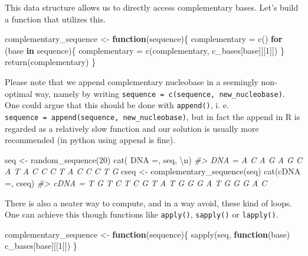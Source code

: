 \documentclass[
]{book}
\newenvironment{Shaded}{\begin{snugshade}}{\end{snugshade}}
\newcommand{\CommentTok}[1]{\textcolor[rgb]{0.56,0.35,0.01}{\textit{#1}}}
\newcommand{\ControlFlowTok}[1]{\textcolor[rgb]{0.13,0.29,0.53}{\textbf{#1}}}
\newcommand{\DecValTok}[1]{\textcolor[rgb]{0.00,0.00,0.81}{#1}}
\newcommand{\FunctionTok}[1]{\textcolor[rgb]{0.00,0.00,0.00}{#1}}
\newcommand{\NormalTok}[1]{#1}
\newcommand{\OtherTok}[1]{\textcolor[rgb]{0.56,0.35,0.01}{#1}}
\newcommand{\SpecialCharTok}[1]{\textcolor[rgb]{0.00,0.00,0.00}{#1}}
\newcommand{\StringTok}[1]{\textcolor[rgb]{0.31,0.60,0.02}{#1}}
\begin{document}
This data structure allows us to directly access complementary bases. Let's build a function that utilizes this.

\begin{Shaded}
\begin{Highlighting}[]
\NormalTok{complementary\_sequence }\OtherTok{\textless{}{-}} \ControlFlowTok{function}\NormalTok{(sequence)\{}
\NormalTok{  complementary }\OtherTok{=} \FunctionTok{c}\NormalTok{()}
  \ControlFlowTok{for}\NormalTok{ (base }\ControlFlowTok{in}\NormalTok{ sequence)\{}
\NormalTok{    complementary }\OtherTok{=} \FunctionTok{c}\NormalTok{(complementary, c\_bases[base][[}\DecValTok{1}\NormalTok{]])}
\NormalTok{  \}}
  \FunctionTok{return}\NormalTok{(complementary)}
\NormalTok{\}}
\end{Highlighting}
\end{Shaded}

Please note that we append complementary nucleobase in a seemingly non-optimal way, namely by writing \texttt{sequence\ =\ c(sequence,\ new\_nucleobase)}. One could argue that this should be done with \texttt{append()}, i. e. \texttt{sequence\ =\ append(sequence,\ new\_nucleobase)}, but in fact the append in R is regarded as a relatively slow function and our solution is usually more recommended (in python using append is fine).

\begin{Shaded}
\begin{Highlighting}[]
\NormalTok{seq }\OtherTok{\textless{}{-}} \FunctionTok{random\_sequence}\NormalTok{(}\DecValTok{20}\NormalTok{)}
\FunctionTok{cat}\NormalTok{(}\StringTok{\textquotesingle{} DNA =\textquotesingle{}}\NormalTok{, seq, }\StringTok{\textquotesingle{}}\SpecialCharTok{\textbackslash{}n}\StringTok{\textquotesingle{}}\NormalTok{)}
\CommentTok{\#\textgreater{}  DNA = A C A G A G C A T A C C C T A C C C T G}
\NormalTok{cseq }\OtherTok{\textless{}{-}} \FunctionTok{complementary\_sequence}\NormalTok{(seq)}
\FunctionTok{cat}\NormalTok{(}\StringTok{\textquotesingle{}cDNA =\textquotesingle{}}\NormalTok{, cseq)}
\CommentTok{\#\textgreater{} cDNA = T G T C T C G T A T G G G A T G G G A C}
\end{Highlighting}
\end{Shaded}

There is also a neater way to compute, and in a way avoid, these kind of loops. One can achieve this though functions like \texttt{apply()}, \texttt{sapply()} or \texttt{lapply()}.

\begin{Shaded}
\begin{Highlighting}[]
\NormalTok{complementary\_sequence }\OtherTok{\textless{}{-}} \ControlFlowTok{function}\NormalTok{(sequence)\{}
  \FunctionTok{sapply}\NormalTok{(seq, }\ControlFlowTok{function}\NormalTok{(base) c\_bases[base][[}\DecValTok{1}\NormalTok{]])}
\NormalTok{\}}
\end{Highlighting}
\end{Shaded}
\end{document}
